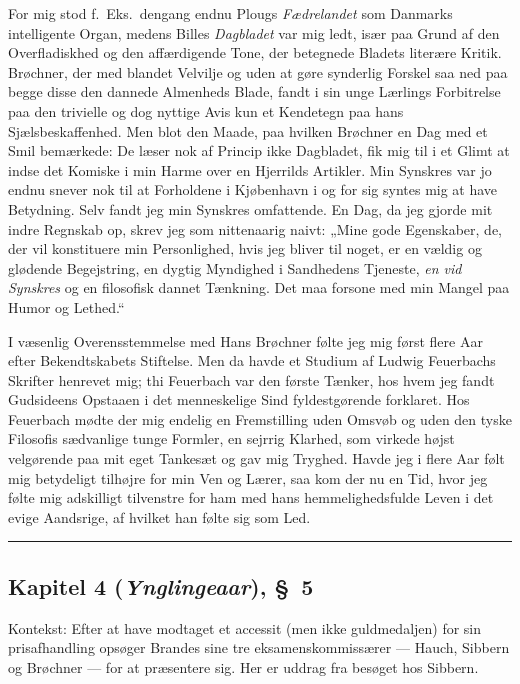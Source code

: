 \documentclass[12pt,a4paper]{article}
\newcommand{\apage}[1]{\marginnote{\footnotesize\textit{[#1]}}}
\begin{document}
For mig stod f.\ Eks.\ dengang endnu Plougs \textit{Fædrelandet} som
Danmarks intelligente Organ, medens Billes \textit{Dagbladet} var mig
ledt, især paa Grund af den Overfladiskhed og den affærdigende Tone,
der betegnede Bladets literære Kritik. Brøchner, der med blandet
Velvilje og uden at gøre synderlig Forskel saa ned paa begge disse den
dannede Almenheds Blade, fandt i sin unge Lærlings Forbitrelse paa den
trivielle og dog nyttige Avis kun et Kendetegn paa hans
Sjælsbeskaffenhed. Men blot den Maade, paa hvilken Brøchner en Dag med
et Smil bemærkede: De læser nok af Princip ikke Dagbladet, fik mig til
i et Glimt at indse det Komiske i min Harme over en Hjerrilds Artikler.
Min Synskres var jo endnu snever nok til at Forholdene i Kjøbenhavn i
og for sig syntes mig at have Betydning. Selv fandt jeg min Synskres
omfattende. En Dag, da jeg gjorde mit indre Regnskab op, skrev jeg som
nittenaarig naivt: „Mine gode Egenskaber, de, der vil konstituere min
Personlighed, hvis jeg bliver til noget, er en vældig og glødende
Begejstring, en dygtig Myndighed i Sandhedens Tjeneste, \textit{en vid
\apage{132}Synskres} og en filosofisk dannet Tænkning. Det maa forsone
med min Mangel paa Humor og Lethed.“

I væsenlig Overensstemmelse med Hans Brøchner følte jeg mig først
flere Aar efter Bekendtskabets Stiftelse. Men da havde et Studium af
Ludwig Feuerbachs Skrifter henrevet mig; thi Feuerbach var den første
Tænker, hos hvem jeg fandt Gudsideens Opstaaen i det menneskelige Sind
fyldestgørende forklaret. Hos Feuerbach mødte der mig endelig en
Fremstilling uden Omsvøb og uden den tyske Filosofis sædvanlige tunge
Formler, en sejrrig Klarhed, som virkede højst velgørende paa mit eget
Tankesæt og gav mig Tryghed. Havde jeg i flere Aar følt mig betydeligt
tilhøjre for min Ven og Lærer, saa kom der nu en Tid, hvor jeg følte
mig adskilligt tilvenstre for ham med hans hemmelighedsfulde Leven i
det evige Aandsrige, af hvilket han følte sig som Led.

\bigskip\hrule\bigskip

\subsection*{Kapitel 4 (\emph{Ynglingeaar}), §~5}

\noindent Kontekst: Efter at have modtaget et accessit (men ikke
guldmedaljen) for sin prisafhandling opsøger Brandes sine tre
eksamenskommissærer --- Hauch, Sibbern og Brøchner --- for at
præsentere sig. Her er uddrag fra besøget hos Sibbern.
\end{document}
